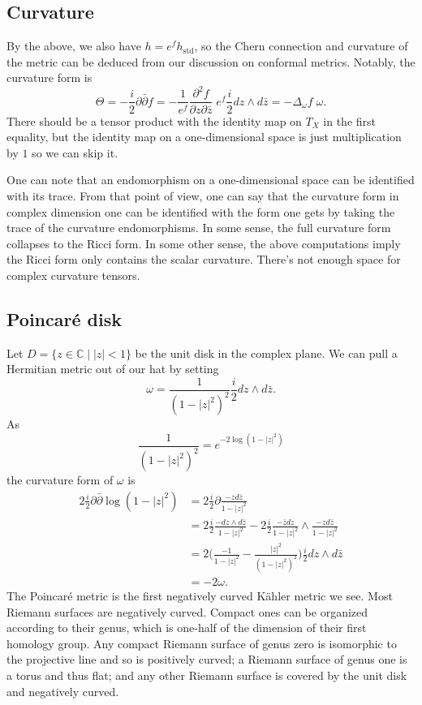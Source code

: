 \documentclass[10pt,a4paper]{article}
\newcommand{\kk}[1]{\mathbb{#1}}
\begin{document}
\subsection{Curvature}
By the above, we also have $h = e^f h_{\mathrm{std}}$, so the Chern connection and curvature of the metric can be deduced from our discussion on conformal metrics. Notably, the curvature form is
$$
\Theta
= -\frac i2\partial\bar\partial f
= -\frac{1}{e^f}\frac{\partial^2f}{\partial z \partial \bar z} \; e^f \frac{i}{2} dz \wedge d\bar z
= -\Delta_\omega f \; \omega.
$$
There should be a tensor product with the identity map on $T_X$ in the first equality, but the identity map on a one-dimensional space is just multiplication by $1$ so we can skip it.

One can note that an endomorphism on a one-dimensional space can be identified with its trace. From that point of view, one can say that the curvature form in complex dimension one can be identified with the form one gets by taking the trace of the curvature endomorphisms. In some sense, the full curvature form collapses to the Ricci form. In some other sense, the above computations imply the Ricci form only contains the scalar curvature. There's not enough space for complex curvature tensors.


\subsection{Poincar\'e disk}

Let $D = \{z \in \kk C \mid |z| < 1\}$ be the unit disk in the complex plane. We can pull a Hermitian metric out of our hat by setting
$$
\omega = \frac 1{(1-|z|^2)^2} \frac i2 dz \wedge d\bar z.
$$
As
$$
\frac 1{(1-|z|^2)^2} = e^{-2\log(1-|z|^2)}
$$
the curvature form of $\omega$ is
\begin{align*}
2\frac i2 \partial\bar\partial \log(1-|z|^2)
&= 2\frac i2 \partial \frac{-z d\bar z}{1-|z|^2}
\\
&= 2\frac i2 \frac{- dz \wedge d\bar z}{1-|z|^2}
- 2\frac i2 \frac{-\bar z dz}{1-|z|^2} \wedge \frac{-zd\bar z}{1-|z|^2}
\\
&= 2\biggl(\frac{-1}{1-|z|^2} - \frac{|z|^2}{(1-|z|^2)^2} \biggr) \frac i2 dz \wedge d\bar z
\\
&= -2 \omega.
\end{align*}
The Poincar\'e metric is the first negatively curved K\"ahler metric we see. Most Riemann surfaces are negatively curved. Compact ones can be organized according to their genus, which is one-half of the dimension of their first homology group. Any compact Riemann surface of genus zero is isomorphic to the projective line and so is positively curved; a Riemann surface of genus one is a torus and thus flat; and any other Riemann surface is covered by the unit disk and negatively curved.
\end{document}
